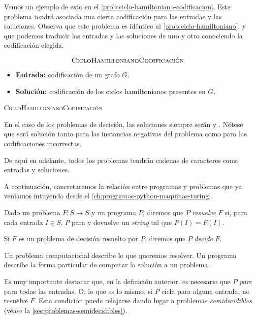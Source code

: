 Vemos un ejemplo de esto en el \cref{prob:ciclo-hamiltoniano-codificacion}. Este problema tendrá asociada una cierta codificación para las entradas y las soluciones. Observa que este problema es idéntico al \cref{prob:ciclo-hamiltoniano}, y que podemos traducir las entradas y las soluciones de uno y otro conociendo la codificación elegida.

\begin{problema}
\begin{framed}
$$\text{\textsc{CicloHamiltonianoCodificación}}$$

\begin{itemize}
    \item \textbf{Entrada:} codificación de un grafo $G$.
    \item \textbf{Solución:} codificación de los ciclos hamiltonianos presentes en $G$.
\end{itemize}
\end{framed}
\caption{\textsc{CicloHamiltonianoCodificación}}
\label{prob:ciclo-hamiltoniano-codificacion}
\end{problema}

En el caso de los problemas de decisión, las soluciones siempre serán  y . Nótese que  será solución tanto para las instancias negativas del problema como para las codificaciones incorrectas.

De aquí en adelante, todos los problemas tendrán cadenas de caracteres como entradas y soluciones.

A continuación, concretaremos la relación entre programas y problemas que ya veníamos intuyendo desde el \cref{ch:programas-python-maquinas-turing}.

\begin{definicion}\label{def:resolver-decidir}
Dado un problema $F:S\longrightarrow S$ y un programa $P$, diremos que $P$ \emph{resuelve} $F$ si, para cada entrada $I\in S$, $P$ para y devuelve un \emph{string} tal que $P(I)=F(I)$.

Si $F$ es un problema de decisión resuelto por $P$, diremos que $P$ \emph{decide} $F$.
\end{definicion}

Un problema computacional describe lo que queremos resolver. Un programa describe la forma particular de computar la solución a un problema.

Es muy importante destacar que, en la definición anterior, es necesario que $P$ \emph{pare} para todas las entradas. O, lo que es lo mismo, si $P$ cicla para alguna entrada, no resuelve $F$. Esta condición puede relajarse dando lugar a problemas \emph{semidecidibles} (véase la \cref{sec:problemas-semidecidibles}).

